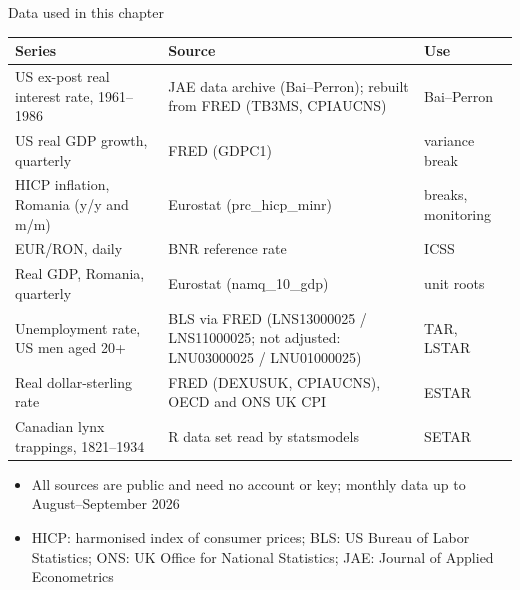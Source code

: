 \begin{frame}{Data used in this chapter}
\itemsize{\footnotesize}
\begin{center}
\scriptsize
\begin{tabular}{>{\raggedright\arraybackslash}p{4.6cm}>{\raggedright\arraybackslash}p{4.6cm}>{\raggedright\arraybackslash}p{2.4cm}}
\toprule
\textbf{Series} & \textbf{Source} & \textbf{Use} \\
\midrule
US ex-post real interest rate, 1961--1986 & JAE data archive (Bai--Perron); rebuilt from FRED (TB3MS, CPIAUCNS) & Bai--Perron \\
US real GDP growth, quarterly & FRED (GDPC1) & variance break \\
HICP inflation, Romania (y/y and m/m) & Eurostat (prc\_hicp\_minr) & breaks, monitoring \\
EUR/RON, daily & BNR reference rate & ICSS \\
Real GDP, Romania, quarterly & Eurostat (namq\_10\_gdp) & unit roots \\
Unemployment rate, US men aged 20+ & BLS via FRED (LNS13000025 / LNS11000025; not adjusted: LNU03000025 / LNU01000025) & TAR, LSTAR \\
Real dollar-sterling rate & FRED (DEXUSUK, CPIAUCNS), OECD and ONS UK CPI & ESTAR \\
Canadian lynx trappings, 1821--1934 & R data set read by statsmodels & SETAR \\
\bottomrule
\end{tabular}
\end{center}
\begin{itemize}
    \item All sources are public and need no account or key; monthly data up to August--September 2026
    \item HICP: harmonised index of consumer prices; BLS: US Bureau of Labor Statistics; ONS: UK Office for National Statistics; JAE: Journal of Applied Econometrics
\end{itemize}
\end{frame}

